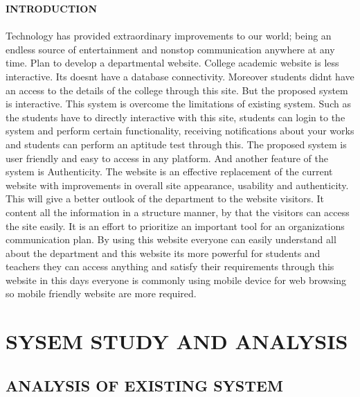 \documentclass[a4paper, 12pt]{report}
\begin{document}
\begin{titlepage}

{\fontsize{16pt}{16pt}\selectfont\bfseries\center INTRODUCTION \par}
\fontsize{14pt}{14pt}\selectfont
\paragraph{}Technology has provided extraordinary improvements to our world; being an endless source of entertainment and nonstop communication anywhere at any time. Plan to develop a departmental website. College academic website is less interactive. Its doesnt have a database connectivity. Moreover students didnt have an access to the details of the college through this site.  But the proposed system is interactive. This system is overcome the limitations of existing system. Such as the students have to directly interactive with this site, students can login to the system and perform certain functionality, receiving notifications about your works  and students can perform an aptitude test through this. The proposed system is  user friendly and easy to access in any platform. And another feature of the system is Authenticity. The website is an effective replacement of the current website with improvements in  overall site appearance, usability and authenticity. This will give a better outlook of the department to the website visitors. It content all the information in a structure manner, by that the visitors can access the site easily. It is an  effort to prioritize  an important tool for an organizations communication plan. By using this website everyone can easily understand all about the department and this website its more powerful for students and teachers they can access anything and satisfy their requirements through this website in this days everyone is commonly using mobile device for web browsing so mobile friendly website are more required.


\end{titlepage}

\newpage
\section{SYSEM STUDY AND ANALYSIS}

\subsection{ANALYSIS OF EXISTING SYSTEM}
\end{document}
